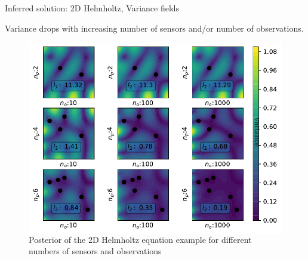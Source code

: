 \documentclass[fleqn,11pt,aspectratio=43]{beamer}
\begin{document}
\begin{frame}{Inferred solution: 2D Helmholtz, Variance fields}

Variance drops with increasing number of sensors and/or number of observations.
\begin{figure}
\begin{columns}
\includegraphics[width=1\textwidth]{../../Python/Results/2D/100procent_no_d/VarField_Posterior.pdf}
\caption{Posterior of the 2D Helmholtz equation example for different numbers of sensors and observations}
\end{columns}
\end{figure}


\end{frame}



%      	
%
%
\end{document}
